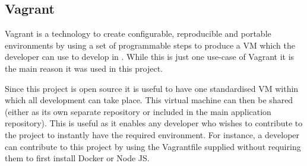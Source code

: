 \subsection{Vagrant}
\label{sub:vagrant}
Vagrant is a technology to create configurable, reproducible and portable environments by using a set of programmable steps to produce a \gls{VM} which the developer can use to develop in \citep{Vagrant2017}. While this is just one use-case of Vagrant it is the main reason it was used in this project. 

Since this project is open source it is useful to have one standardised VM within which all development can take place. This virtual machine can then be shared (either as its own separate repository or included in the main application repository). This is useful as it enables any developer who wishes to contribute to the project to instantly have the required environment. For instance, a developer can contribute to this project by using the \gls{Vagrantfile} supplied without requiring them to first install Docker or Node JS.
